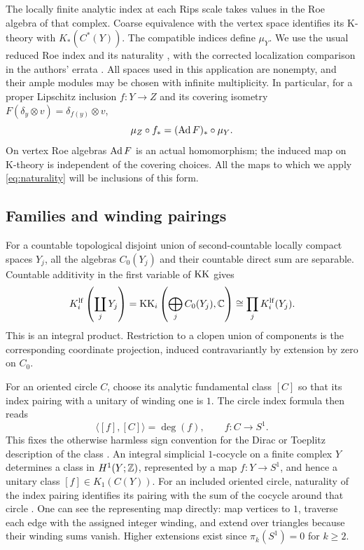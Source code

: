 The locally finite analytic index at each Rips scale takes values in the
Roe algebra of that complex. Coarse equivalence with the vertex space
identifies its K-theory with $K_*(C^*(Y))$. The compatible indices define
$\mu_Y$. We use the usual reduced Roe index and its naturality
\cite[Sections~5.1 and~6.7, Lemma~7.1.3 and Theorem~7.2.16]{WY}, with the corrected localization
comparison in the authors' errata \cite[items~30--31]{WYerrata}.
All spaces used in this application are nonempty, and their ample modules
may be chosen with infinite multiplicity. In particular, for a proper
Lipschitz inclusion $f:Y\to Z$ and its covering isometry
$F(\delta_y\otimes v)=\delta_{f(y)}\otimes v$,
\begin{equation}\label{eq:naturality}
 \mu_Z\circ f_*=(\operatorname{Ad} F)_*\circ\mu_Y.
\end{equation}
On vertex Roe algebras $\operatorname{Ad} F$ is an actual homomorphism; the induced map on
K-theory is independent of the covering choices. All the maps to which we
apply \eqref{eq:naturality} will be inclusions of this form.

\subsection{Families and winding pairings}
For a countable topological disjoint union of second-countable locally compact
spaces $Y_j$, all the algebras $C_0(Y_j)$ and their countable direct sum are
separable. Countable additivity in the first variable of $\operatorname{KK}$
\cite[Theorem~19.7.1 and Section~19.8.10]{Blackadar} gives
\begin{equation}\label{eq:additivity}
 K_i^{\mathrm{lf}}\left(\coprod_jY_j\right)
 =\operatorname{KK}_i\left(\bigoplus_j C_0(Y_j),\mathbb C\right)
 \cong\prod_j K_i^{\mathrm{lf}}(Y_j).
\end{equation}
This is an integral product. Restriction to a clopen union of components is
the corresponding coordinate projection, induced contravariantly by
extension by zero on $C_0$.

For an oriented circle $C$, choose its analytic fundamental class $[C]$ so
that its index pairing with a unitary of winding one is $1$. The circle index
formula then reads
\begin{equation}\label{eq:winding}
 \langle[f],[C]\rangle=\deg(f),\qquad f:C\to S^1.
\end{equation}
This fixes the otherwise harmless sign convention for the Dirac or Toeplitz
description of the class \cite[Example~4.2.4]{Khalkhali}.
An integral simplicial $1$-cocycle on a finite complex $Y$ determines a class
in $H^1(Y;\mathbb Z)$, represented by a map $f:Y\to S^1$, and hence a unitary
class $[f]\in K_1(C(Y))$. For an included oriented circle, naturality of the
index pairing identifies its pairing with the sum of the cocycle around
that circle \cite[Proposition~18.7.1 and Corollary~18.10.3]{Blackadar}.
One can see the representing map directly: map vertices to
$1$, traverse each edge with the assigned integer winding, and extend over
triangles because their winding sums vanish. Higher extensions exist since
$\pi_k(S^1)=0$ for $k\ge2$.
